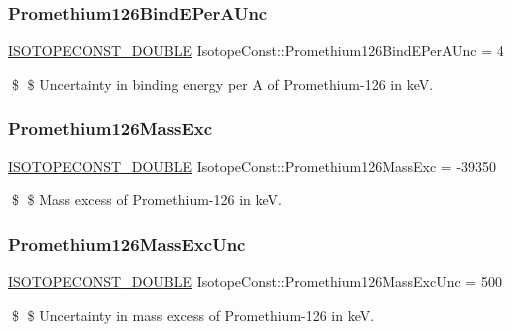 \subsubsection{\texorpdfstring{Promethium126\+Bind\+E\+Per\+A\+Unc}{Promethium126BindEPerAUnc}}
{\footnotesize\ttfamily \mbox{\hyperlink{group___isotope_const-_macros_ga8f45a7272ce02c0b4c65c44636ed719a}{I\+S\+O\+T\+O\+P\+E\+C\+O\+N\+S\+T\+\_\+\+D\+O\+U\+B\+LE}} Isotope\+Const\+::\+Promethium126\+Bind\+E\+Per\+A\+Unc = 4}

\$ \$ Uncertainty in binding energy per A of Promethium-\/126 in keV. \mbox{\label{group___isotope_const-_promethium-_pm126_gaca05d9c799cbca3298f8144b8ae8e680}} 
\subsubsection{\texorpdfstring{Promethium126\+Mass\+Exc}{Promethium126MassExc}}
{\footnotesize\ttfamily \mbox{\hyperlink{group___isotope_const-_macros_ga8f45a7272ce02c0b4c65c44636ed719a}{I\+S\+O\+T\+O\+P\+E\+C\+O\+N\+S\+T\+\_\+\+D\+O\+U\+B\+LE}} Isotope\+Const\+::\+Promethium126\+Mass\+Exc = -\/39350}

\$ \$ Mass excess of Promethium-\/126 in keV. \mbox{\label{group___isotope_const-_promethium-_pm126_ga9255c1a29276b78ae465f8e9bbfe5d13}} 
\subsubsection{\texorpdfstring{Promethium126\+Mass\+Exc\+Unc}{Promethium126MassExcUnc}}
{\footnotesize\ttfamily \mbox{\hyperlink{group___isotope_const-_macros_ga8f45a7272ce02c0b4c65c44636ed719a}{I\+S\+O\+T\+O\+P\+E\+C\+O\+N\+S\+T\+\_\+\+D\+O\+U\+B\+LE}} Isotope\+Const\+::\+Promethium126\+Mass\+Exc\+Unc = 500}

\$ \$ Uncertainty in mass excess of Promethium-\/126 in keV. \mbox{\label{group___isotope_const-_promethium-_pm126_gac753156ae99647b3faf216ffdf23e04e}} 
